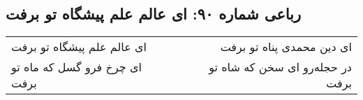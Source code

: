\begin{center}
\section*{رباعی شماره ۹۰: ای عالم علم پیشگاه تو برفت}
\label{sec:sh090}
\begin{longtable}{l p{0.5cm} r}
ای عالم علم پیشگاه تو برفت
&&
ای دین محمدی پناه تو برفت
\\
ای چرخ فرو گسل که ماه تو برفت
&&
در حجله‌رو ای سخن که شاه تو برفت
\\
\end{longtable}
\end{center}
